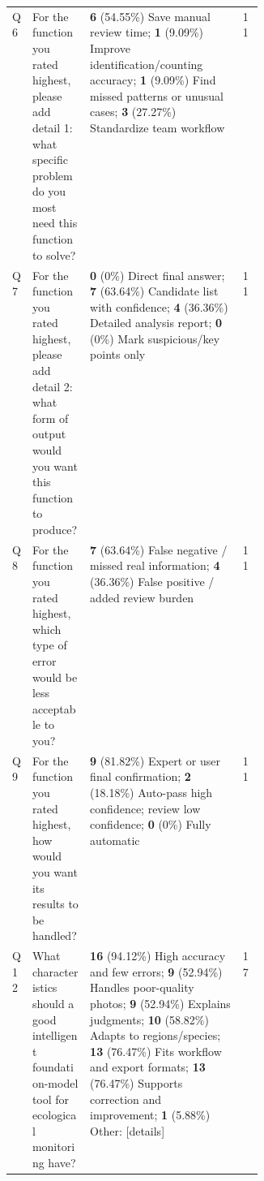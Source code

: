 \begin{table}[h]
\begin{tabularx}{\textwidth}{p{0.05\linewidth}p{0.23\linewidth}X p{0.08\linewidth}}
Q6 & For the function you rated highest, please add detail 1: what specific problem do you most need this function to solve? & \textbf{6} (54.55\%) Save manual review time; \textbf{1} (9.09\%) Improve identification/counting accuracy; \textbf{1} (9.09\%) Find missed patterns or unusual cases; \textbf{3} (27.27\%) Standardize team workflow & 11 \\
Q7 & For the function you rated highest, please add detail 2: what form of output would you want this function to produce? & \textbf{0} (0\%) Direct final answer; \textbf{7} (63.64\%) Candidate list with confidence; \textbf{4} (36.36\%) Detailed analysis report; \textbf{0} (0\%) Mark suspicious/key points only & 11 \\
Q8 & For the function you rated highest, which type of error would be less acceptable to you? & \textbf{7} (63.64\%) False negative / missed real information; \textbf{4} (36.36\%) False positive / added review burden & 11 \\
Q9 & For the function you rated highest, how would you want its results to be handled? & \textbf{9} (81.82\%) Expert or user final confirmation; \textbf{2} (18.18\%) Auto-pass high confidence; review low confidence; \textbf{0} (0\%) Fully automatic & 11 \\
Q12 & What characteristics should a good intelligent foundation-model tool for ecological monitoring have? & \textbf{16} (94.12\%) High accuracy and few errors; \textbf{9} (52.94\%) Handles poor-quality photos; \textbf{9} (52.94\%) Explains judgments; \textbf{10} (58.82\%) Adapts to regions/species; \textbf{13} (76.47\%) Fits workflow and export formats; \textbf{13} (76.47\%) Supports correction and improvement; \textbf{1} (5.88\%) Other: [details] & 17 \\
\bottomrule
\end{tabularx}
\end{table}

